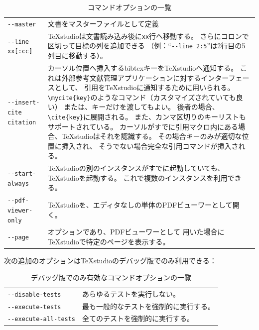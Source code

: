 \begin{table}[H]
  \centering
  \caption{コマンドオプションの一覧}
  \begin{tabularx}{\linewidth}{lX}
    \hline
    \verb+--master+ & 文書をマスターファイルとして定義\\
    \verb+--line xx[:cc]+
      & TeXstudioは文書読み込み後に\texttt{xx}行へ移動する。
      さらにコロンで区切って目標の列を追加できる
      （例：``\verb+--line 2:5+''は2行目の5列目に移動する）。\\
    \verb+--insert-cite citation+
      & カーソル位置へ挿入するbibtexキーをTeXstudioへ通知する。
      これは外部参考文献管理アプリケーションに対するインターフェースとして、
      引用をTeXstudioに通知するために用いられる。
      \verb+\mycite{key}+のようなコマンド（カスタマイズされていても良い）
      または、キーだけを渡してもよい。
      後者の場合、\verb+\cite{key}+に展開される。
      また、カンマ区切りのキーリストもサポートされている。
      カーソルがすでに引用マクロ内にある場合、TeXstudioはそれを認識する。
      その場合キーのみが適切な位置に挿入され、
      そうでない場合完全な引用コマンドが挿入される。\\
    \verb+--start-always+
      & TeXstudioの別のインスタンスがすでに起動していても、TeXstudioを起動する。
      これで複数のインスタンスを利用できる。\\
    \verb+--pdf-viewer-only+
      & TeXstudioを、エディタなしの単体のPDFビューワーとして開く。\\
    \verb+--page+
      & オプションであり、PDFビューワーとして
      用いた場合にTeXstudioで特定のページを表示する。\\
    \hline
  \end{tabularx}
\end{table}

次の追加のオプションはTeXstudioのデバッグ版でのみ利用できる：

\begin{table}[H]
  \centering
  \caption{デバッグ版でのみ有効なコマンドオプションの一覧}
  \begin{tabularx}{\linewidth}{lX}
    \hline
    \verb+--disable-tests+ & あらゆるテストを実行しない。\\
    \verb+--execute-tests+ & 最も一般的なテストを強制的に実行する。\\
    \verb+--execute-all-tests+ & 全てのテストを強制的に実行する。\\
    \hline
  \end{tabularx}
\end{table}

